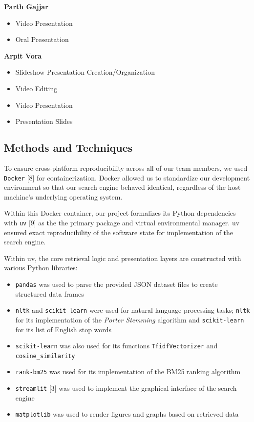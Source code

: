 \textbf{Parth Gajjar}
\begin{itemize}
    \item Video Presentation
    \item Oral Presentation
\end{itemize}

\textbf{Arpit Vora}
\begin{itemize}
    \item Slideshow Presentation Creation/Organization
    \item Video Editing
    \item Video Presentation
    \item Presentation Slides
\end{itemize}


\subsection*{Methods and Techniques}
{}

To ensure cross-platform reproducibility across all of our team members, 
we used \texttt{Docker} [8] for containerization. Docker allowed us to standardize
our development environment so that our search engine behaved identical, 
regardless of the host machine's underlying operating system. 

Within this Docker container, our project formalizes its Python dependencies 
with \texttt{uv} [9] as the the primary package and virtual environmental manager. 
uv ensured exact reproducibility of the software state for implementation of 
the search engine. 

Within uv, the core retrieval logic and presentation layers are constructed 
with various Python libraries:
\begin{itemize}
    \item   \texttt{pandas} was used to parse the provided JSON dataset files 
            to create structured data frames 
    \item   \texttt{nltk} and \texttt{scikit-learn} were used for natural 
            language processing tasks; \texttt{nltk} for its implementation 
            of the \textit{Porter Stemming} algorithm and \texttt{scikit-learn}
            for its list of English stop words
    \item   \texttt{scikit-learn} was also used for its functions 
            \texttt{TfidfVectorizer} and \texttt{cosine\_similarity}
    \item   \texttt{rank-bm25} was used for its implementation of the BM25 
            ranking algorithm 
    \item   \texttt{streamlit} [3] was used to implement the graphical interface 
            of the search engine 
    \item   \texttt{matplotlib} was used to render figures and graphs based 
            on retrieved data 
\end{itemize}



